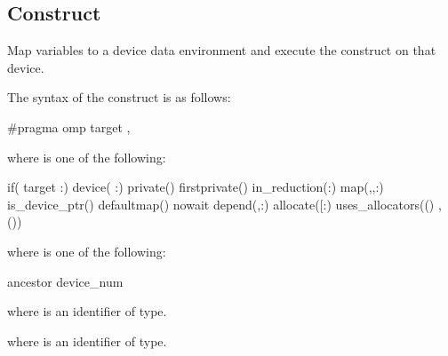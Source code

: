 \subsection{ Construct}
\label{subsec:target Construct}
\summary
Map variables to a device data environment and execute the construct on that device.
\syntax
\begin{ccppspecific}
The syntax of the  construct is as follows:

\begin{ompcPragma}
#pragma omp target \plc{[clause[ [},\plc{] clause] ... ] new-line}
\end{ompcPragma}

where  is one of the following:

\begin{indentedcodelist}
if(\plc{[} target :\plc{] scalar-expression})
device(\plc{[ device-modifier} :\plc{] integer-expression})
private()
firstprivate()
in_reduction(:)
map(\plc{[[map-type-modifier[},\plc{] [map-type-modifier[},\plc{] ...] map-type}:\plc{ ] locator-list})
is_device_ptr()
defaultmap()
nowait
depend(\plc{[depend-modifier},\plc{] dependence-type }:)
allocate([\plc{[allocator }:\plc{] list})
uses_allocators(\plc{allocator[}()\plc{]}
	       \plc{[},\plc{allocator[}()\plc{] ...]})
\end{indentedcodelist}

where  is one of the following:
\begin{indentedcodelist}
ancestor
device_num
\end{indentedcodelist}

where  is an identifier of  type.

where  is an identifier of  type.
\end{ccppspecific}

